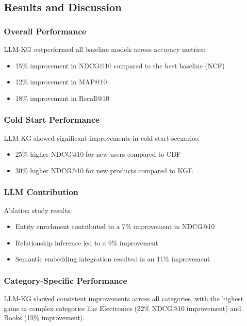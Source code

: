 \documentclass{article}
\begin{document}
\subsection{Results and Discussion}

\subsubsection{Overall Performance}
LLM-KG outperformed all baseline models across accuracy metrics:
\begin{itemize}
    \item 15\% improvement in NDCG@10 compared to the best baseline (NCF)
    \item 12\% improvement in MAP@10
    \item 18\% improvement in Recall@10
\end{itemize}

\subsubsection{Cold Start Performance}
LLM-KG showed significant improvements in cold start scenarios:
\begin{itemize}
    \item 25\% higher NDCG@10 for new users compared to CBF
    \item 30\% higher NDCG@10 for new products compared to KGE
\end{itemize}

\subsubsection{LLM Contribution}
Ablation study results:
\begin{itemize}
    \item Entity enrichment contributed to a 7\% improvement in NDCG@10
    \item Relationship inference led to a 9\% improvement
    \item Semantic embedding integration resulted in an 11\% improvement
\end{itemize}

\subsubsection{Category-Specific Performance}
LLM-KG showed consistent improvements across all categories, with the highest gains in complex categories like Electronics (22\% NDCG@10 improvement) and Books (19\% improvement).
\end{document}
